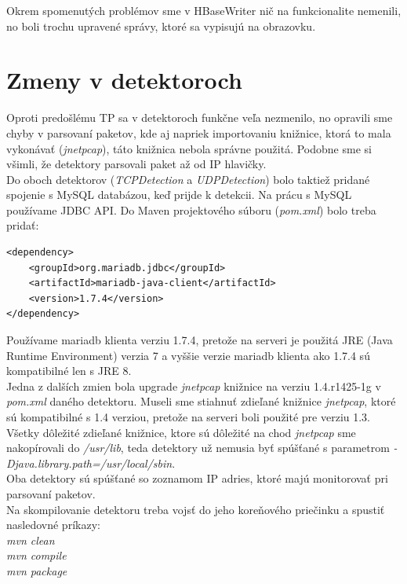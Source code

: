 \documentclass[a4paper,12pt]{article}
\begin{document}
\noindent Okrem spomenutých problémov sme v HBaseWriter nič na funkcionalite nemenili, no boli trochu upravené správy, ktoré sa vypisujú na obrazovku. \\
 
\section{Zmeny v detektoroch}
Oproti predošlému TP sa v detektoroch funkčne veľa nezmenilo, no opravili sme chyby v parsovaní paketov, kde aj napriek importovaniu knižnice, ktorá to mala vykonávať (\textit{jnetpcap}), táto knižnica nebola správne použitá. Podobne sme si všimli, že detektory parsovali paket až od IP hlavičky. \\

Do oboch detektorov (\textit{TCPDetection} a \textit{UDPDetection}) bolo taktiež pridané spojenie s MySQL databázou, keď prijde k detekcii. Na prácu s MySQL používame JDBC API. Do Maven projektového súboru (\textit{pom.xml}) bolo treba pridať:

\begin{lstlisting}
<dependency>
	<groupId>org.mariadb.jdbc</groupId>
	<artifactId>mariadb-java-client</artifactId>
	<version>1.7.4</version>
</dependency>
\end{lstlisting}

Používame mariadb klienta verziu 1.7.4, pretože na serveri je použitá JRE (Java Runtime Environment) verzia 7 a vyššie verzie mariadb klienta ako 1.7.4 sú kompatibilné len s JRE 8. \\

Jedna z dalších zmien bola upgrade \textit{jnetpcap} knižnice na verziu 1.4.r1425-1g v \textit{pom.xml} daného detektoru. Museli sme stiahnuť zdieľané knižnice \textit{jnetpcap}, ktoré sú kompatibilné s 1.4 verziou, pretože na serveri boli použité pre verziu 1.3. Všetky dôležité zdieľané knižnice, ktore sú dôležité na chod \textit{jnetpcap} sme nakopírovali do \textit{/usr/lib}, teda detektory už nemusia byť spúšťané s parametrom \textit{-Djava.library.path=/usr/local/sbin}. \\

Oba detektory sú spúšťané so zoznamom IP adries, ktoré majú monitorovať pri parsovaní paketov. \\

Na skompilovanie detektoru treba vojsť do jeho koreňového priečinku a spustiť nasledovné príkazy: \\

\noindent \textit{mvn clean \\
mvn compile \\
mvn package} \\
\end{document}

